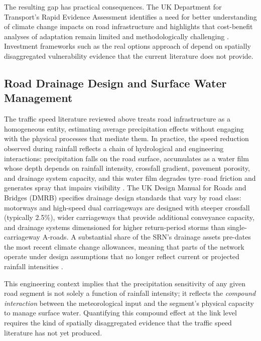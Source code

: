 \documentclass[review,authoryear]{elsarticle}
\begin{document}
The resulting gap has practical consequences. The UK Department for Transport's Rapid Evidence Assessment identifies a need for better understanding of climate change impacts on road infrastructure and highlights that cost-benefit analyses of adaptation remain limited and methodologically challenging \citep{dft2024rea}. Investment frameworks such as the real options approach of \citet{zare2025risk} depend on spatially disaggregated vulnerability evidence that the current literature does not provide.

\subsection{Road Drainage Design and Surface Water Management}
\label{sec:lit:drainage}

The traffic speed literature reviewed above treats road infrastructure as a homogeneous entity, estimating average precipitation effects without engaging with the physical processes that mediate them. In practice, the speed reduction observed during rainfall reflects a chain of hydrological and engineering interactions: precipitation falls on the road surface, accumulates as a water film whose depth depends on rainfall intensity, crossfall gradient, pavement porosity, and drainage system capacity, and this water film degrades tyre--road friction and generates spray that impairs visibility \citep{pregnolato2017depth}. The UK Design Manual for Roads and Bridges (DMRB) specifies drainage design standards that vary by road class: motorways and high-speed dual carriageways are designed with steeper crossfall (typically 2.5\%), wider carriageways that provide additional conveyance capacity, and drainage systems dimensioned for higher return-period storms than single-carriageway A-roads. A substantial share of the SRN's drainage assets pre-dates the most recent climate change allowances, meaning that parts of the network operate under design assumptions that no longer reflect current or projected rainfall intensities \citep{nh2024climate,orr2024annual}.

This engineering context implies that the precipitation sensitivity of any given road segment is not solely a function of rainfall intensity; it reflects the \textit{compound interaction} between the meteorological input and the segment's physical capacity to manage surface water. Quantifying this compound effect at the link level requires the kind of spatially disaggregated evidence that the traffic speed literature has not yet produced.
\end{document}
